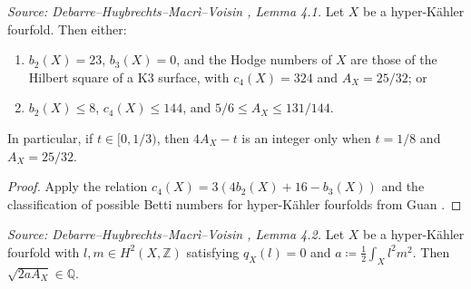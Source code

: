 \begin{lemma}
  \label{lem:betti-numbers}
  \textit{Source: Debarre--Huybrechts--Macr\`i--Voisin \cite{MR4654610}, Lemma 4.1.}
  Let \(X\) be a hyper-K\"ahler fourfold.  Then either:
  \begin{enumerate}
    \item[(a)] \(b_2(X) = 23\), \(b_3(X) = 0\), and the Hodge numbers of \(X\) are those
      of the Hilbert square of a K3 surface, with \(c_4(X) = 324\) and
      \(A_X = 25/32\); or
    \item[(b)] \(b_2(X) \le 8\), \(c_4(X) \le 144\), and \(5/6 \le A_X \le 131/144\).
  \end{enumerate}
  In particular, if \(t \in [0, 1/3)\), then \(4A_X - t\) is an integer only when
  \(t = 1/8\) and \(A_X = 25/32\).
\end{lemma}

\begin{proof}
  Apply the relation \(c_4(X) = 3(4b_2(X) + 16 - b_3(X))\) and the classification of
  possible Betti numbers for hyper-K\"ahler fourfolds from Guan
  \cite[Main Theorem]{gua}.
\end{proof}

\begin{lemma}
  \label{lem:sqrt-rationality}
  \textit{Source: Debarre--Huybrechts--Macr\`i--Voisin \cite{MR4654610}, Lemma 4.2.}
  Let \(X\) be a hyper-K\"ahler fourfold with \(l, m \in H^2(X, \mathbb{Z})\) satisfying
  \(q_X(l) = 0\) and \(a \coloneqq \tfrac{1}{2}\int_X l^2 m^2\).  Then
  \(\sqrt{2aA_X} \in \mathbb{Q}\).
\end{lemma}

